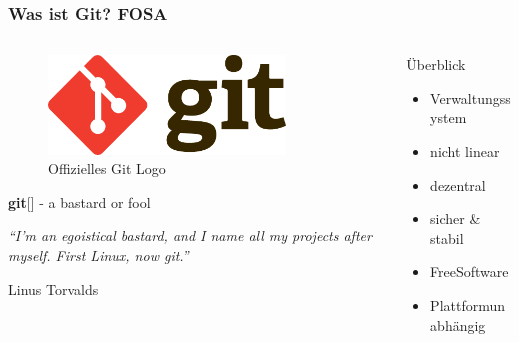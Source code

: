 \begin{frame}
	\frametitle{Was ist Git? \hfill{} \footnotesize{FOSA}}
	\begin{columns}
		\begin{column}{5cm}
			\begin{figure}
				\centering
				\includegraphics[width=0.8\textwidth]{fig/git_logo.pdf}
				\caption{Offizielles Git Logo}
			\end{figure}
			\footnotesize{
				\textbf{git}[] - a bastard or fool
				\epigraph{\textit{"`I'm an egoistical bastard, and I name all 
				my projects after myself. First Linux, 
				now git."'}}{Linus Torvalds}
			}\normalsize
		\end{column}
		\begin{column}{5cm}
			\begin{block}{Überblick}
				\begin{itemize}
					\item Verwaltungssystem
					\item nicht linear
					\item dezentral
					\item sicher \& stabil
					\item FreeSoftware
					\item Plattformunabhängig
				\end{itemize}
			\end{block}
		\end{column}
	\end{columns}
\end{frame}

